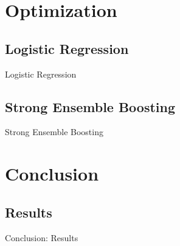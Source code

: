 \documentclass{beamer}
\begin{document}
\section{Optimization}

\subsection{Logistic Regression}
\begin{frame}{Logistic Regression}

\end{frame}


\subsection{Strong Ensemble Boosting}
\begin{frame}{Strong Ensemble Boosting}

\end{frame}


\section{Conclusion}
\subsection{Results}
\begin{frame}{Conclusion: Results}

\end{frame}
\end{document}
